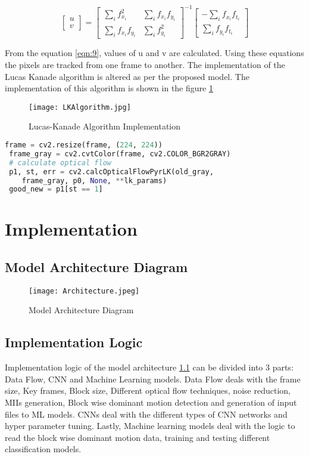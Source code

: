 \begin{equation}\label{eqn:9}
\begin{bmatrix}
u\\
v
\end{bmatrix} = \begin{bmatrix}
\sum_{i} f_{x_{i}}^2 & \sum_{i} f_{x_{i}}f_{y_{i}} \\
\sum_{i} f_{x_{i}}f_{y_{i}} & \sum_{i} f_{y_{i}}^2
\end{bmatrix}^{-1} \begin{bmatrix}
-\sum_{i} f_{x_{i}}f_{t_{i}} \\
\sum_{i} f_{y_{i}}f_{t_{i}} 
\end{bmatrix} 
\end{equation}

From the equation \ref{eqn:9}, values of u and v are calculated. Using these equations the pixels are tracked from one frame to another. The implementation of the Lucas Kanade algorithm is altered as per the proposed model. The implementation of this algorithm is shown in the figure \ref{fig:LKAlgorithm}
\begin{figure}[tb]
	\center\texttt{[image: LKAlgorithm.jpg]}
	\caption{Lucas-Kanade Algorithm Implementation}
	\label{fig:LKAlgorithm}
\end{figure}

 \begin{lstlisting}[language=Python, frame=single, caption=Python code to compute Lucas-Kanade algorithm]
 frame = cv2.resize(frame, (224, 224))
 frame_gray = cv2.cvtColor(frame, cv2.COLOR_BGR2GRAY)
 # calculate optical flow
 p1, st, err = cv2.calcOpticalFlowPyrLK(old_gray, 
 	frame_gray, p0, None, **lk_params)
 good_new = p1[st == 1]
\end{lstlisting}

\chapter{Implementation}
\section{Model Architecture Diagram}

\begin{figure}[h!]
	\center\texttt{[image: Architecture.jpeg]}
	\caption{Model Architecture Diagram}
	\label{fig:Architecture}
\end{figure}

\section{Implementation Logic}
Implementation logic of the model architecture \ref{fig:Architecture} can be divided into 3 parts: Data Flow, CNN and Machine Learning models. Data Flow deals with the frame size, Key frames, Block size, Different optical flow techniques, noise reduction, MIIs generation, Block wise dominant motion detection and generation of input files to ML models. CNNs deal with the different types of CNN networks and  hyper parameter tuning. Lastly, Machine learning models deal with the logic to read the block wise dominant motion data, training and testing different classification models. 
